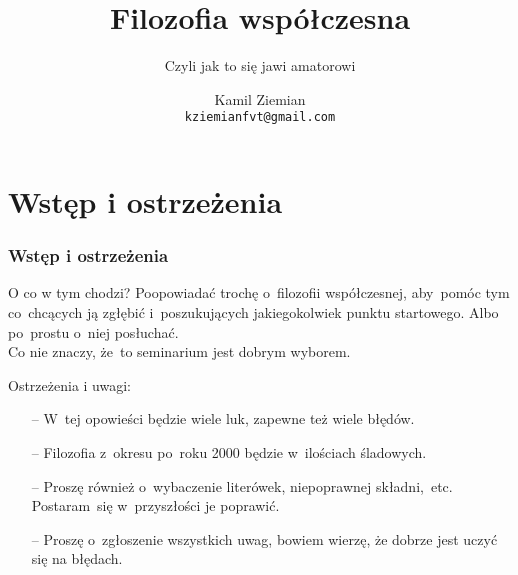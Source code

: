 \documentclass{beamer}  %
\title[Filozofia współczesna]{Filozofia współczesna}
\subtitle{Czyli jak to się jawi amatorowi}
\author{Kamil Ziemian \\
  \texttt{kziemianfvt@gmail.com}}
\institute{Uniwersytet Jagielloński, \\
  Wydział Fizyki, Astronomii i Informatyki Stosowanej, \\
  Kraków}
\begin{document}



\begin{frame}
  \titlepage
\end{frame}



\section[]{Wstęp i ostrzeżenia}



\begin{frame}
  \frametitle{Wstęp i ostrzeżenia}

  \begin{block}{O co w tym chodzi?}
    Poopowiadać trochę o~filozofii współczesnej, aby~pomóc tym
    co~chcących ją zgłębić i~poszukujących jakiegokolwiek punktu
    startowego. Albo po~prostu o~niej posłuchać. \\
    Co nie znaczy, że~to seminarium jest dobrym wyborem.
  \end{block}

  \begin{block}{Ostrzeżenia i uwagi:}
    \begin{itemize}
    \item[--] W~tej opowieści będzie wiele luk, zapewne też wiele
      błędów.
    \item[--] Filozofia z~okresu po~roku 2000 będzie w~ilościach
      śladowych.
    \item[--] Proszę również o~wybaczenie literówek, niepoprawnej
      składni,~etc. Postaram~się w~przyszłości je poprawić.
    \item[--] Proszę o~zgłoszenie wszystkich uwag, bowiem wierzę, że
      dobrze jest uczyć się na błędach.
    \end{itemize}
  \end{block}

\end{frame}
\end{document}
